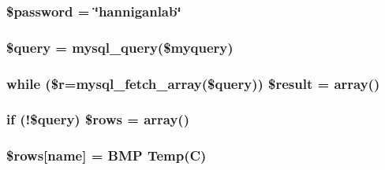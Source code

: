\subsubsection[{\texorpdfstring{\$password}{$password}}]{\setlength{\rightskip}{0pt plus 5cm}\$password = \char`\"{}hanniganlab\char`\"{}}\hypertarget{_b_m_p___j_s_o_n_8php_a607686ef9f99ea7c42f4f3dd3dbb2b0d}{}\label{_b_m_p___j_s_o_n_8php_a607686ef9f99ea7c42f4f3dd3dbb2b0d}
\subsubsection[{\texorpdfstring{\$query}{$query}}]{\setlength{\rightskip}{0pt plus 5cm}\$query = mysql\+\_\+query(\$myquery)}\hypertarget{_b_m_p___j_s_o_n_8php_af59a5f7cd609e592c41dc3643efd3c98}{}\label{_b_m_p___j_s_o_n_8php_af59a5f7cd609e592c41dc3643efd3c98}
\subsubsection[{\texorpdfstring{\$result}{$result}}]{\setlength{\rightskip}{0pt plus 5cm}while (\$r=mysql\+\_\+fetch\+\_\+array(\$query)) \$result = array()}\hypertarget{_b_m_p___j_s_o_n_8php_a9148136d1e11f768be4f805d7e567da2}{}\label{_b_m_p___j_s_o_n_8php_a9148136d1e11f768be4f805d7e567da2}
\subsubsection[{\texorpdfstring{\$rows}{$rows}}]{\setlength{\rightskip}{0pt plus 5cm}if (!\$query) \$rows = array()}\hypertarget{_b_m_p___j_s_o_n_8php_a9d560e904e6665a6ee21f86a65c1ef8e}{}\label{_b_m_p___j_s_o_n_8php_a9d560e904e6665a6ee21f86a65c1ef8e}
\subsubsection[{\texorpdfstring{\$rows}{$rows}}]{\setlength{\rightskip}{0pt plus 5cm}\$rows\mbox{[}\textquotesingle{}name\textquotesingle{}\mbox{]} = \textquotesingle{}B\+MP Temp(C)\textquotesingle{}}\hypertarget{_b_m_p___j_s_o_n_8php_a6384d385f2f9c3f6bcad27ed87e67106}{}\label{_b_m_p___j_s_o_n_8php_a6384d385f2f9c3f6bcad27ed87e67106}

